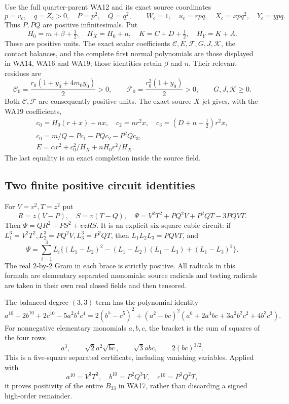 Use the full quarter-parent WA12 and its exact source coordinates
\[
 p=v_c,\quad q=Z_c>0,\quad P=p^2,\quad Q=q^2,\qquad
 W_c=1,\quad u_c=rpq,\quad X_c=xpq^2,\quad Y_c=ypq.
 \tag{WN1}
\]
Thus \(P,PQ\) are positive infinitesimals. Put
\[
 H_0=m+\beta+\tfrac12,\quad H_X=H_0+n,\quad
 K=C+D+\tfrac12,\quad H_Y=K+A.
 \tag{WN2}
\]
These are positive units. The exact scalar coefficients
\(\mathcal C,E,\mathcal F,G,J,\mathcal K\), the contact balances, and
the complete first normal polynomials are those displayed in
WA14, WA16 and WA19; those identities retain \(\beta\) and \(n\).
Their relevant residues are
\[
 \mathcal C_0=\frac{r_0(1+y_0+4m_0y_0)}2>0,\qquad
 \mathcal F_0=\frac{r_0^2(1+y_0)}2>0,
 \qquad G,J,\mathcal K\geq0 .
 \tag{WN3}
\]
Both \(\mathcal C,\mathcal F\) are consequently positive units.
The exact source \(X\)-jet gives, with the WA19 coefficients,
\[
\begin{gathered}
 c_0=H_0(r+x)+nx,\quad c_2=nr^2x,\quad
 c_3=(D+n+\tfrac12)r^2x,\\
 c_0=m/Q-Pc_1-PQc_2-P^2Qc_3,\\
 E=\alpha r^2+c_0^2/H_X+nH_0r^2/H_X .
\end{gathered}\tag{WN4}
\]
The last equality is an exact completion inside the source field.

\subsection{Two finite positive circuit identities}

For \(V=v^2,T=z^2\) put
\[
 R=z(V-P),\quad S=v(T-Q),\quad
 \Psi=V^2T^2+PQ^2V+P^2QT-3PQVT .
\]
Then \(\Psi=QR^2+PS^2+vzRS\). It is an explicit six-square
cubic circuit: if \(L_1^3=V^2T^2,L_2^3=PQ^2V,L_3^3=P^2QT\),
then \(L_1L_2L_3=PQVT\), and
\[
 \Psi=\sum_{i=1}^3 L_i
 \bigl\{(L_1-L_2)^2-(L_1-L_2)(L_1-L_3)+(L_1-L_3)^2\bigr\}.
 \tag{WN5}
\]
The real \(2\)-by-\(2\) Gram in each brace is strictly positive.
All radicals in this formula are elementary separated monomials:
source radicals and testing radicals are taken in their own real
closed fields and then tensored.

The balanced degree-\((3,3)\) term has the polynomial identity
\[
 a^{10}+2b^{10}+2c^{10}-5a^2b^4c^4
 =2(b^5-c^5)^2
 +(a^2-bc)^2(a^6+2a^4bc+3a^2b^2c^2+4b^3c^3).
 \tag{WN6}
\]
For nonnegative elementary monomials \(a,b,c\), the bracket is the
sum of squares of the four rows
\[
 a^3,\qquad \sqrt2a^2\sqrt{bc},\qquad
 \sqrt3abc,\qquad 2(bc)^{3/2}.
\]
This is a five-square separated certificate, including vanishing
variables. Applied with
\[
 a^{10}=V^3T^3,\quad b^{10}=P^2Q^3V,\quad c^{10}=P^3Q^2T,
\]
it proves positivity of the entire \(B_{33}\) in WA17, rather than
discarding a signed high-order remainder.

